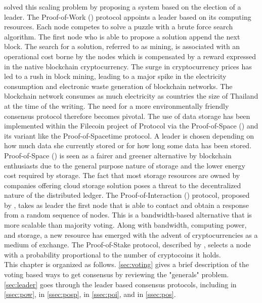 \noindent \citet{Na08} solved this scaling problem by proposing a system based on the election of a leader. The Proof-of-Work (\PoW) protocol appoints a leader based on its computing resources. Each node competes to solve a puzzle with a brute force search algorithm. The first node who is able to propose a solution append the next block. The search for a solution, referred to as mining, is associated with an operational cost borne by the nodes which is compensated by a reward expressed in the native blockchain cryptocurrency. The surge in cryptocurrency prices has led to a rush in block mining, leading to a major spike in the electricity consumption and electronic waste generation of blockchain networks. The blockchain network consumes as much electricity as countries the size of Thailand at the time of the writing. The need for a more environmentally friendly consensus protocol therefore becomes pivotal. The use of data storage has been implemented within the Filecoin project of Protocol \citet{protocol2017filecoin} via the Proof-of-Space (\PoSp) and its variant like the Proof-of-Spacetime protocol. A leader is chosen depending on how much data she currently stored or for how long some data has been stored. Proof-of-Space (\PoSp) is seen as a fairer and greener alternative by blockchain enthusiasts due to the general purpose nature of storage and the lower energy cost required by storage. The fact that most storage resources are owned by companies offering cloud storage solution poses a threat to the decentralized nature of the distributed ledger. The Proof-of-Interaction (\PoI) protocol, proposed by \citet{Abegg2021}, takes as leader the first node that is able to contact and obtain a response from a random sequence of nodes. This is a bandwidth-based alternative that is more scalable than majority voting. Along with bandwidth, computing power, and storage, a new resource has emerged with the advent of cryptocurrencies as a medium of exchange. The Proof-of-Stake protocol, described by \citet{Saleh2020}, selects a node with a probability proportional to the number of cryptocoins it holds. \\

\noindent This chapter is organized as follows. \cref{sec:voting} gives a brief description of the voting based ways to get consensus by reviewing the "generals" problem. \cref{sec:leader} goes through the leader based consensus protocols, including \PoW in \cref{ssec:pow}, \PoSp in \cref{ssec:posp}, \PoI in \cref{ssec:poi}, and \PoS in \cref{ssec:pos}. 

